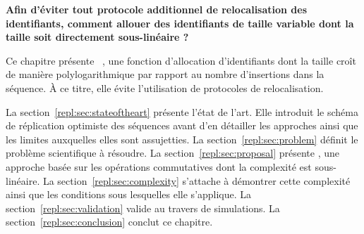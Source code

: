 \textbf{Afin d'éviter tout protocole additionnel de relocalisation des
identifiants, comment allouer des identifiants de taille variable dont la taille
soit directement sous-linéaire ?}

Ce chapitre présente \LSEQ~\cite{nedelec2013concurrency, nedelec2013lseq}, une
fonction d'allocation d'identifiants dont la taille croît de manière
polylogarithmique par rapport au nombre d'insertions dans la séquence. À ce
titre, elle évite l'utilisation de protocoles de relocalisation.

La section~\ref{repl:sec:stateoftheart} présente l'état de l'art. Elle introduit
le schéma de réplication optimiste des séquences avant d'en détailler les
approches ainsi que les limites auxquelles elles sont assujetties.  La
section~\ref{repl:sec:problem} définit le problème scientifique à résoudre. La
section~\ref{repl:sec:proposal} présente \LSEQ, une approche basée sur les
opérations commutatives dont la complexité est sous-linéaire. La
section~\ref{repl:sec:complexity} s'attache à démontrer cette complexité ainsi
que les conditions sous lesquelles elle s'applique. La
section~\ref{repl:sec:validation} valide \LSEQ au travers de simulations. La
section~\ref{repl:sec:conclusion} conclut ce chapitre.



